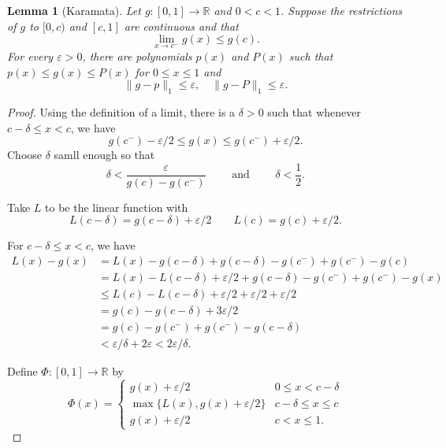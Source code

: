 \documentclass[12pt]{amsart}
\newtheorem{lemma}[theorem]{Lemma}
\newcommand{\R}{\mathbb{R}}
\begin{document}
\begin{enumerate}[label=(\alph*)]
\begin{lemma}[Karamata]
	Let $g: [0,1]\to\R$ and $0 < c < 1$. Suppose the restrictions of $g$ to $[0, c)$ and $[c, 1]$ are continuous and that 
	\begin{equation*}
		\lim_{x\to c^-}g(x)\le g(c).
	\end{equation*}
	For every $\varepsilon > 0$, there are polynomials $p(x)$ and $P(x)$ such that $p(x)\le g(x)\le P(x)$ for $0\le x\le 1$ and 
	\begin{equation*}
		\|g - p\|_1\le\varepsilon,\quad\|g- P\|_1\le\varepsilon.
	\end{equation*}
\end{lemma}
\begin{proof}
	Using the definition of a limit, there is a $\delta > 0$ such that whenever $c - \delta\le x < c$, we have 
	\begin{equation*}
		g(c^-) - \varepsilon/2\le g(x)\le g(c^-) + \varepsilon/2.
	\end{equation*}
	Choose $\delta$ samll enough so that 
	\begin{equation*}
		\delta < \frac{\varepsilon}{g(c) - g(c^-)}\qquad\text{ and }\qquad\delta < \frac{1}{2}.
	\end{equation*}

	Take $L$ to be the linear function with 
	\begin{equation*}
		L(c - \delta) = g(c - \delta) + \varepsilon/2\qquad L(c) = g(c) + \varepsilon/2.
	\end{equation*}
	
	For $c - \delta\le x < c$, we have 
	\begin{align*}
		L(x) - g(x) &= L(x) - g(c - \delta) + g(c - \delta) - g(c^-) + g(c^-) - g(c)\\
		&= L(x) - L(c - \delta) + \varepsilon/2 + g(c - \delta) - g(c^-) + g(c^-) - g(x)\\
		&\le L(c) - L(c - \delta) + \varepsilon/2 + \varepsilon/2 + \varepsilon/2\\
		&= g(c) - g(c - \delta) + 3\varepsilon/2\\
		&= g(c) - g(c^-) + g(c^-) - g(c - \delta)\\
		&< \varepsilon/\delta + 2\varepsilon < 2\varepsilon/\delta.
	\end{align*}

	Define $\Phi: [0,1]\to\R$ by 
	\begin{equation*}
		\Phi(x) = 
		\begin{cases}
			g(x) + \varepsilon/2 & 0\le x < c - \delta\\
			\max\{L(x), g(x) + \varepsilon/2\} & c - \delta\le x\le c\\
			g(x) + \varepsilon/2 & c < x\le 1.
		\end{cases}
	\end{equation*}


\end{proof}
\end{enumerate}
\end{document}
